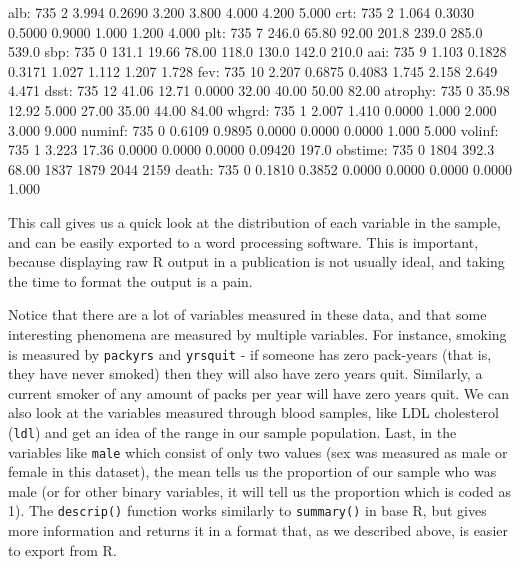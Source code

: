 \documentclass[landscape]{article}
\renewenvironment{Schunk}{\vspace{\topsep}}{\vspace{\topsep}}
\begin{document}
\begin{Schunk}
\begin{Soutput}
     alb:     735     2   3.994     0.2690    3.200     3.800     4.000     4.200      5.000  
     crt:     735     2   1.064     0.3030    0.5000    0.9000    1.000     1.200      4.000  
     plt:     735     7   246.0     65.80     92.00     201.8     239.0     285.0      539.0  
     sbp:     735     0   131.1     19.66     78.00     118.0     130.0     142.0      210.0  
     aai:     735     9   1.103     0.1828    0.3171    1.027     1.112     1.207      1.728  
     fev:     735    10   2.207     0.6875    0.4083    1.745     2.158     2.649      4.471  
    dsst:     735    12   41.06     12.71     0.0000    32.00     40.00     50.00      82.00  
 atrophy:     735     0   35.98     12.92     5.000     27.00     35.00     44.00      84.00  
   whgrd:     735     1   2.007     1.410     0.0000    1.000     2.000     3.000      9.000  
  numinf:     735     0   0.6109    0.9895    0.0000    0.0000    0.0000    1.000      5.000  
  volinf:     735     1   3.223     17.36     0.0000    0.0000    0.0000   0.09420     197.0  
 obstime:     735     0    1804     392.3     68.00      1837      1879      2044      2159   
   death:     735     0   0.1810    0.3852    0.0000    0.0000    0.0000    0.0000     1.000  
\end{Soutput}
\end{Schunk}

This call gives us a quick look at the distribution of each variable in the sample, and can be easily exported to a word processing software. This is important, because displaying raw R output in a publication is not usually ideal, and taking the time to format the output is a pain.

Notice that there are a lot of variables measured in these data, and that some interesting phenomena are measured by multiple variables. For instance, smoking is measured by \texttt{packyrs} and \texttt{yrsquit} - if someone has zero pack-years (that is, they have never smoked) then they will also have zero years quit. Similarly, a current smoker of any amount of packs per year will have zero years quit. We can also look at the variables measured through blood samples, like LDL cholesterol (\texttt{ldl}) and get an idea of the range in our sample population. Last, in the variables like \texttt{male} which consist of only two values (sex was measured as male or female in this dataset), the mean tells us the proportion of our sample who was male (or for other binary variables, it will tell us the proportion which is coded as 1). The \texttt{descrip()} function works similarly to \texttt{summary()} in base R, but gives more information and returns it in a format that, as we described above, is easier to export from R.
\end{document}

